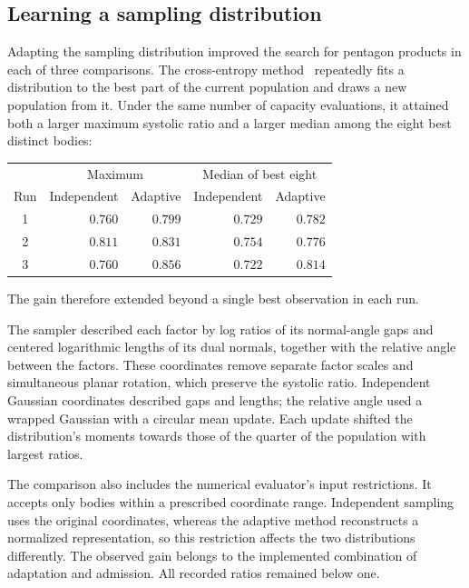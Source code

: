 \begin{samepage}
\subsection{Learning a sampling distribution}

Adapting the sampling distribution improved the search for pentagon
products in each of three comparisons. The cross-entropy
method~\cite{dsDeBoer2005} repeatedly fits a distribution to the best part
of the current population and draws a new population from it. Under the
same number of capacity evaluations, it attained both a larger maximum
systolic ratio and a larger median among the eight best distinct bodies:
\begin{center}
\begin{tabular}{crrrr}
\toprule
 & \multicolumn{2}{c}{Maximum} & \multicolumn{2}{c}{Median of best eight}\\
Run & Independent & Adaptive & Independent & Adaptive\\
\midrule
1 & $0.760$ & $0.799$ & $0.729$ & $0.782$\\
2 & $0.811$ & $0.831$ & $0.754$ & $0.776$\\
3 & $0.760$ & $0.856$ & $0.722$ & $0.814$\\
\bottomrule
\end{tabular}
\end{center}
\end{samepage}
The gain therefore extended beyond a single best observation in each run.

The sampler described each factor by log ratios of its normal-angle gaps
and centered logarithmic lengths of its dual normals, together with the
relative angle between the factors. These coordinates remove separate
factor scales and simultaneous planar rotation, which preserve the
systolic ratio. Independent Gaussian coordinates described gaps and
lengths; the relative angle used a wrapped Gaussian with a circular mean
update. Each update shifted the distribution's moments towards those of
the quarter of the population with largest ratios.

The comparison also includes the numerical evaluator's input restrictions.
It accepts only bodies within a prescribed coordinate range. Independent
sampling uses the original coordinates, whereas the adaptive method
reconstructs a normalized representation, so this restriction affects
the two distributions differently. The observed gain belongs to the
implemented combination of adaptation and admission. All recorded ratios
remained below one.
